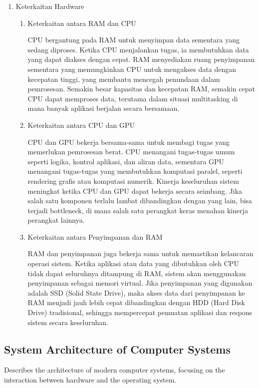 \documentclass[12pt]{article}
\begin{document}
\begin{enumerate}
\begin{enumerate}
    \end{enumerate}
    
    \item {Keterkaitan Hardware}
    \par \begin{enumerate}
        \item {{Keterkaitan antara RAM dan CPU}}
        \par CPU bergantung pada RAM untuk menyimpan data sementara yang sedang diproses. Ketika CPU menjalankan tugas, ia membutuhkan data yang dapat diakses dengan cepat. RAM menyediakan ruang penyimpanan sementara yang memungkinkan CPU untuk mengakses data dengan kecepatan tinggi, yang membantu mencegah penundaan dalam pemrosesan. Semakin besar kapasitas dan kecepatan RAM, semakin cepat CPU dapat memproses data, terutama dalam situasi multitasking di mana banyak aplikasi berjalan secara bersamaan.
    
        \item {{Keterkaitan antara CPU dan GPU}}
        \par CPU dan GPU bekerja bersama-sama untuk membagi tugas yang memerlukan pemrosesan berat. CPU menangani tugas-tugas umum seperti logika, kontrol aplikasi, dan aliran data, sementara GPU menangani tugas-tugas yang membutuhkan komputasi paralel, seperti rendering grafis atau komputasi numerik. Kinerja keseluruhan sistem meningkat ketika CPU dan GPU dapat bekerja secara seimbang. Jika salah satu komponen terlalu lambat dibandingkan dengan yang lain, bisa terjadi bottleneck, di mana salah satu perangkat keras menahan kinerja perangkat lainnya.
    
        \item {{Keterkaitan antara Penyimpanan dan RAM}}
        \par RAM dan penyimpanan juga bekerja sama untuk memastikan kelancaran operasi sistem. Ketika aplikasi atau data yang dibutuhkan oleh CPU tidak dapat seluruhnya ditampung di RAM, sistem akan menggunakan penyimpanan sebagai memori virtual. Jika penyimpanan yang digunakan adalah SSD (Solid State Drive), maka akses data dari penyimpanan ke RAM menjadi jauh lebih cepat dibandingkan dengan HDD (Hard Disk Drive) tradisional, sehingga mempercepat pemuatan aplikasi dan respons sistem secara keseluruhan.
    
    \end{enumerate} 

\end{enumerate}

\subsection{System Architecture of Computer Systems}
Describes the architecture of modern computer systems, focusing on the interaction between hardware and the operating system.
\end{document}
